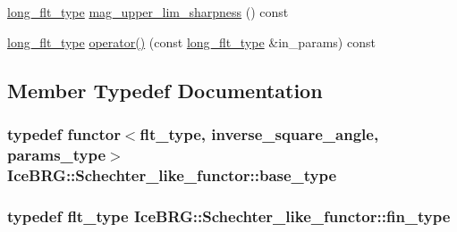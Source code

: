 \begin{DoxyCompactItemize}
\item 
\hyperlink{lib_2IceBRG__main_2common_8h_a7040956e7e1b504d34a9ccfb4253bdce}{long\-\_\-flt\-\_\-type} \hyperlink{classIceBRG_1_1Schechter__like__functor_a9067e3ec4ebd3df8ee873f729334e7ad}{mag\-\_\-upper\-\_\-lim\-\_\-sharpness} () const 
\item 
\hyperlink{lib_2IceBRG__main_2common_8h_a7040956e7e1b504d34a9ccfb4253bdce}{long\-\_\-flt\-\_\-type} \hyperlink{classIceBRG_1_1Schechter__like__functor_a969b8cbbbb6cc12cf666d3a1e3a3dd74}{operator()} (const \hyperlink{lib_2IceBRG__main_2common_8h_a7040956e7e1b504d34a9ccfb4253bdce}{long\-\_\-flt\-\_\-type} \&in\-\_\-params) const 
\end{DoxyCompactItemize}


\subsection{Member Typedef Documentation}
\hypertarget{classIceBRG_1_1Schechter__like__functor_a919adc2367dc8f3b9939f3ae87d14315}{
\subsubsection[{base\-\_\-type}]{\setlength{\rightskip}{0pt plus 5cm}typedef {\bf functor}$<${\bf flt\-\_\-type}, {\bf inverse\-\_\-square\-\_\-angle}, {\bf params\-\_\-type}$>$ {\bf Ice\-B\-R\-G\-::\-Schechter\-\_\-like\-\_\-functor\-::base\-\_\-type}}}\label{classIceBRG_1_1Schechter__like__functor_a919adc2367dc8f3b9939f3ae87d14315}
\hypertarget{classIceBRG_1_1Schechter__like__functor_aa444797b63bb4d4b01859b9c6a5d528e}{
\subsubsection[{fin\-\_\-type}]{\setlength{\rightskip}{0pt plus 5cm}typedef {\bf flt\-\_\-type} {\bf Ice\-B\-R\-G\-::\-Schechter\-\_\-like\-\_\-functor\-::fin\-\_\-type}}}\label{classIceBRG_1_1Schechter__like__functor_aa444797b63bb4d4b01859b9c6a5d528e}
